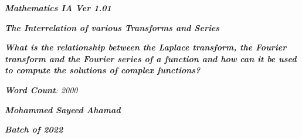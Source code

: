 

\begin{titlepage}
    \begin{center}
            
        \date{}
            
        \huge
            
        \textit{\textbf{Mathematics IA Ver 1.01}}
            
        \vspace{0.25cm}
            
        \hline
            
        \vspace{2.5cm}
            
        \textit{\textbf{The Interrelation of various Transforms and Series}}
            
        \vspace{1cm}
            
        \LARGE
            
        \textit{\textbf{What is the relationship between the Laplace transform, the Fourier transform and the Fourier series of a function and how can it be used to compute the solutions of complex functions? }}
            
        \vspace{2.5cm}

		\Large        
        
        \textit{\textbf{Word Count}: 2000}
        
		\vspace{1cm}        
            
        \Large
            
        \textit{\textbf{Mohammed Sayeed Ahamad}}
            
        \vspace{2cm}
            
        \Large
            
        \textit{\textbf{Batch of 2022}}
            
        \vspace{0.25cm}
            
        \hline
           
            
    \end{center}
\end{titlepage}



